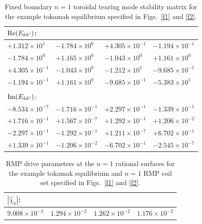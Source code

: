 \documentclass[12pt,prb,aps]{revtex4-1}
\begin{document}
\begin{table}[h]
\centering
\begin{tabular}{llll}
${\rm Re}(E_{kk'})$:&&&\\[0.5ex]\hline
$+1.312\times 10^1$& $-1.784\times 10^0$&  $+4.305\times 10^{-1}$& $-1.194\times 10^{-1} $\\[0.5ex]
$-1.784\times 10^0$& $+1.165\times 10^0 $&$-1.043\times 10^0$ & $+1.161\times 10^0$\\[0.5ex]
$ +4.305\times 10^{-1} $&$-1.043\times 10^0$ &$-1.212\times 10^1$ &$-9.685\times 10^{-1}$ \\[0.5ex]
$-1.194\times 10^{-1}$& $ +1.161\times 10^0$&$ -9.685\times 10^{-1}$ &$-5.383\times 10^1$\\\hline\\[0.5ex]
${\rm Im}(E_{kk'})$:&&&\\[0.5ex]\hline
$-8.534\times 10^{-7}$&  $-1.716\times 10^{-1}$& $ +2.297\times 10^{-1}$& $-1.339\times 10^{-1}$\\[0.5ex]
$+1.716\times 10^{-1}$& $+1.567\times 10^{-7}$&  $+1.292\times 10^{-1}$&  $+1.206\times 10^{-2}$\\[0.5ex]
$-2.297\times 10^{-1}$& $-1.292\times 10^{-1}$& $+1.211\times 10^{-7}$&  $+6.702\times 10^{-1}$\\[0.5ex]
 $+1.339\times 10^{-1}$& $-1.206\times 10^{-2}$& $-6.702\times 10^{-1}$ &$-2.545\times 10^{-7}$
\\\hline
\end{tabular}
\caption{Fixed boundary $n=1$ toroidal tearing mode stability matrix for the example tokamak equilibrium specified in Figs.~\ref{f1} and \ref{f2}. }\label{t1a}
\end{table}

\begin{table}[h]
\centering
\begin{tabular}{llll}
$|\hat{\chi}_{k}|$:&&&\\[0.5ex]\hline
$9.008\times 10^{-3}$& $1.294\times 10^{-2}$& $1.262\times 10^{-2}$ & $1.176\times 10^{-2}$
\\\hline
\end{tabular}
\caption{RMP drive parameters at the $n=1$ rational surfaces for the example tokamak equilibrium and $n=1$ RMP coil set specified in Figs.~\ref{f1} and \ref{f2}. }\label{t2}
\end{table}

\newpage 
\end{document}
